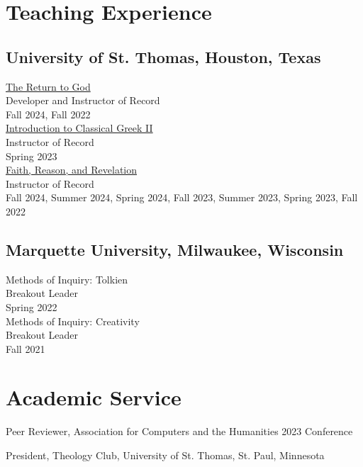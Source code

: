 \documentclass[letterpaper,12pt]{article}
\newcommand{\years}[1]{%
  {\reversemarginpar\strut\marginnote{{\small#1}}}%
}
\begin{document}
{{{{{{{%
\section*{Teaching Experience}

\subsection*{University of St. Thomas, Houston, Texas}

\href{https://www.coreystephan.com/teaching/return-to-god/}{The Return to God} \\
Developer and Instructor of Record \\
Fall 2024, Fall 2022 \\ [.3cm]
%
\href{https://www.coreystephan.com/teaching/greek/}{Introduction to Classical Greek II} \\
Instructor of Record \\
Spring 2023 \\ [.3cm]
%
\href{https://www.coreystephan.com/teaching/faith-reason-revelation/}{Faith, Reason, and Revelation} \\
Instructor of Record \\
Fall 2024, Summer 2024, Spring 2024, Fall 2023, Summer 2023, Spring 2023, Fall 2022

\subsection*{Marquette University, Milwaukee, Wisconsin}

Methods of Inquiry: Tolkien \\
Breakout Leader \\
Spring 2022 \\ [.3cm]
%
Methods of Inquiry: Creativity \\
Breakout Leader \\
Fall 2021

\section*{Academic Service}

\years{2023}%
%
Peer Reviewer, Association for Computers and the Humanities 2023 Conference \\ [.3cm]
%
\years{2012--2015}%
%
President, Theology Club, University of St. Thomas, St. Paul, Minnesota

}}}}}}}
\end{document}
